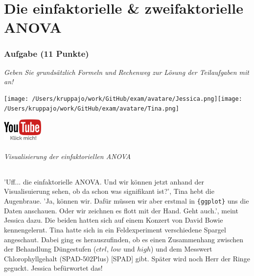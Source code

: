 \documentclass[a4paper, 9pt]{scrartcl}\usepackage[]{graphicx}\usepackage[]{xcolor}
\begin{document}
\clearpage
\part{Die einfaktorielle \& zweifaktorielle ANOVA}

\section{Aufgabe \hfill (11 Punkte)}

\textit{Geben Sie grundsätzlich Formeln und Rechenweg zur Lösung der Teilaufgaben mit an!} \\[1Ex]
 

 
\begin{minipage}[t]{0.5\textwidth}
\texttt{[image: /Users/kruppajo/work/GitHub/exam/avatare/Jessica.png]}\hspace{-4mm}\texttt{[image: /Users/kruppajo/work/GitHub/exam/avatare/Tina.png]}
\end{minipage}
\begin{minipage}[t]{0.5\textwidth}
\hfill
\href{https://youtu.be/kHmfEmU6lrk}{\includegraphics[width = 2cm]{img/youtube}}
\end{minipage}



\paragraph{Visualisierung der einfaktoriellen ANOVA}

'Uff... die einfaktorielle ANOVA. Und wir können jetzt anhand der Visualisuierung sehen, ob da schon was signifikant ist?', Tina hebt die Augenbraue. 'Ja, können wir. Dafür müssen wir aber erstmal in \texttt{\{ggplot\}} uns die Daten anschauen. Oder wir zeichnen es flott mit der Hand. Geht auch.', meint Jessica dazu. Die beiden hatten sich auf einem Konzert von David Bowie kennengelernt. Tina hatte sich in ein Feldexperiment verschiedene Spargel angeschaut. Dabei ging es herauszufinden, ob es einen Zusammenhang zwischen der Behandlung Düngestufen ($ctrl$, $low$ und $high$) und dem Messwert Chlorophyllgehalt (SPAD-502Plus) [SPAD] gibt. Später wird noch Herr der Ringe geguckt. Jessica befürwortet das!
\end{document}
